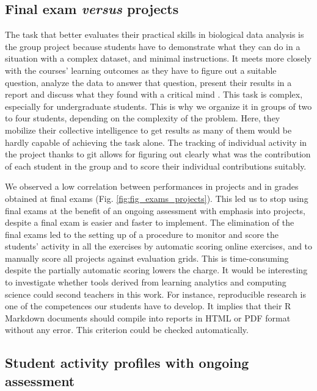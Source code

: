 \documentclass{aims}
\theoremstyle{definition}
\begin{document}
\hypertarget{final-exam-versus-projects-2}{%
\subsection{\texorpdfstring{Final exam \emph{versus}
projects}{Final exam versus projects}}\label{final-exam-versus-projects-2}}

The task that better evaluates their practical skills in biological data
analysis is the group project because students have to demonstrate what
they can do in a situation with a complex dataset, and minimal
instructions. It meets more closely with the courses' learning outcomes
as they have to figure out a suitable question, analyze the data to
answer that question, present their results in a report and discuss what
they found with a critical mind \cite{Auker2020}. This task is complex,
especially for undergraduate students. This is why we organize it in
groups of two to four students, depending on the complexity of the
problem. Here, they mobilize their collective intelligence to get
results as many of them would be hardly capable of achieving the task
alone. The tracking of individual activity in the project thanks to git
allows for figuring out clearly what was the contribution of each
student in the group and to score their individual contributions
suitably.

We observed a low correlation between performances in projects and in
grades obtained at final exams (Fig. \ref {fig:fig_exams_projects}).
This led us to stop using final exams at the benefit of an ongoing
assessment with emphasis into projects, despite a final exam is easier
and faster to implement. The elimination of the final exams led to the
setting up of a procedure to monitor and score the students' activity in
all the exercises by automatic scoring online exercises, and to manually
score all projects against evaluation grids. This is time-consuming
despite the partially automatic scoring lowers the charge. It would be
interesting to investigate whether tools derived from learning analytics
and computing science could second teachers in this work. For instance,
reproducible research is one of the competences our students have to
develop. It implies that their R Markdown documents should compile into
reports in HTML or PDF format without any error. This criterion could be
checked automatically.

\hypertarget{student-activity-profiles-with-ongoing-assessment}{%
\subsection{Student activity profiles with ongoing
assessment}\label{student-activity-profiles-with-ongoing-assessment}}
\end{document}
